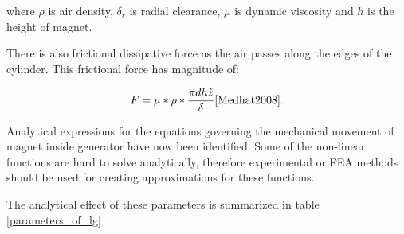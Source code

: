 where $\rho$ is air density, $\delta_r$ is radial clearance, $\mu$ is dynamic viscosity and $h$ is the height of magnet. \cite{Tornincasa2012}

There is also frictional dissipative force as the air passes along the edges of the cylinder. This frictional force has magnitude of: 

\begin{equation}
  F = \mu * \rho * \frac{\pi d h \dot{z}}{\delta} \cite{Medhat2008}. 
\end{equation}

Analytical expressions for the equations governing the mechanical movement of magnet inside generator have now been identified. Some of the non-linear functions are hard to solve analytically, therefore experimental or FEA methods should be used for creating approximations for these functions.

The analytical effect of these parameters is summarized in table \ref{parameters_of_lg}

\begin{table}[htb]
\caption{\label{parameters_of_lg} Effect of parameters of generator}
\begin{center}
\end{center}
\end{table}


